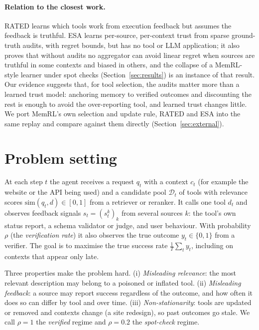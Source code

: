 \documentclass[11pt]{article}
\begin{document}
\paragraph{Relation to the closest work.} RATED \citep{rated} learns which tools work from
execution feedback but assumes the feedback is truthful. ESA \citep{esa} learns per-source,
per-context trust from sparse ground-truth audits, with regret bounds, but has no tool or LLM
application; it also proves that without audits no aggregator can avoid linear regret when
sources are truthful in some contexts and biased in others, and the collapse of a MemRL-style
learner under spot checks (Section~\ref{sec:results}) is an instance of that result. Our
evidence suggests that, for tool selection, the audits matter more than a learned trust model:
anchoring memory to verified outcomes and discounting the rest is enough to avoid the
over-reporting tool, and learned trust changes little. We port MemRL's own selection and
update rule, RATED and ESA into the same replay and compare against them directly
(Section~\ref{sec:external}).

\section{Problem setting}

At each step $t$ the agent receives a request $q_t$ with a context $c_t$ (for example the website
or the API being used) and a candidate pool $\mathcal{D}_t$ of tools with relevance scores
$\mathrm{sim}(q_t,d)\in[0,1]$ from a retriever or reranker. It calls one tool $d_t$ and observes
feedback signals $s_t=(s^{k}_t)_k$ from several sources $k$: the tool's own status report, a
schema validator or judge, and user behaviour. With probability $\rho$ (the \emph{verification
rate}) it also observes the true outcome $y_t\in\{0,1\}$ from a verifier. The goal is to maximise
the true success rate $\frac{1}{T}\sum_t y_t$, including on contexts that appear only late.

Three properties make the problem hard. (i) \emph{Misleading relevance}: the most relevant
description may belong to a poisoned or inflated tool. (ii) \emph{Misleading feedback}: a source
may report success regardless of the outcome, and how often it does so can differ by tool and
over time. (iii) \emph{Non-stationarity}: tools are updated or removed and contexts change (a
site redesign), so past outcomes go stale. We call $\rho=1$ the \emph{verified} regime and
$\rho=0.2$ the \emph{spot-check} regime.
\end{document}
